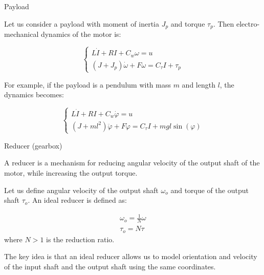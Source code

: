 \documentclass{beamer}
\begin{document}
\begin{frame}{Payload}
	\begin{flushleft}
		
		Let us consider a payload with moment of inertia $J_p$ and torque $\tau_p$. Then electro-mechanical dynamics of the motor is:
		
		\begin{equation}
			\begin{cases}
				L \dot I + RI + C_w \omega = u \\
				(J+J_p) \dot \omega + F \omega = C_\tau I + \tau_p
			\end{cases}
		\end{equation}
		
		For example, if the payload is a pendulum with mass $m$ and length $l$, the dynamics becomes:
		
		\begin{equation}
			\begin{cases}
				L \dot I + RI + C_w \dot \varphi = u \\
				(J+ml^2) \ddot \varphi + F \dot \varphi = C_\tau I + mgl\sin(\varphi)
			\end{cases}
		\end{equation}
		
		
	\end{flushleft}
\end{frame}




\begin{frame}{Reducer (gearbox)}
	\begin{flushleft}
		
		A reducer is a mechanism for reducing angular velocity of the output shaft of the motor, while increasing the output torque.
		
		Let us define angular velocity of the output shaft $\omega_o$ and torque of the output shaft $\tau_o$. An ideal reducer is defined as:
		
		\begin{align}
			\omega_o = \frac{1}{N} \omega \\
			\tau_o = N \tau
		\end{align}
	where $N > 1$ is the reduction ratio.
	
	\bigskip
	
	The key idea is that an ideal reducer allows us to model orientation and velocity of the input shaft and the output shaft using the same coordinates.
		
		
	\end{flushleft}
\end{frame}
\end{document}
